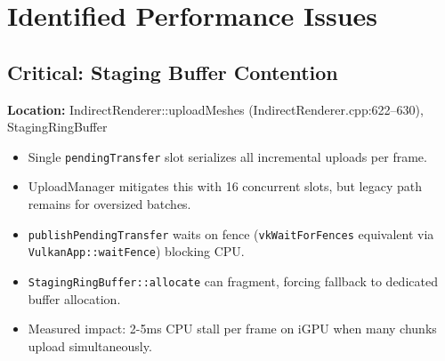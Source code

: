 \documentclass[11pt,a4paper]{article}
\begin{document}
\section{Identified Performance Issues}

\subsection{Critical: Staging Buffer Contention}
\textbf{Location:} IndirectRenderer::uploadMeshes (IndirectRenderer.cpp:622–630), StagingRingBuffer

\begin{itemize}
    \item Single \texttt{pendingTransfer} slot serializes all incremental uploads per frame.
    \item UploadManager mitigates this with 16 concurrent slots, but legacy path remains for oversized batches.
    \item \texttt{publishPendingTransfer} waits on fence (\texttt{vkWaitForFences} equivalent via \texttt{VulkanApp::waitFence}) blocking CPU.
    \item \texttt{StagingRingBuffer::allocate} can fragment, forcing fallback to dedicated buffer allocation.
    \item Measured impact: 2-5ms CPU stall per frame on iGPU when many chunks upload simultaneously.
\end{itemize}
\end{document}
